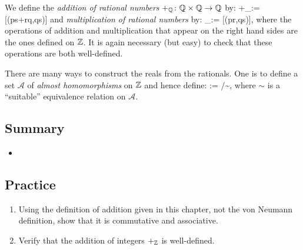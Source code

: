 \bd
We define the \emph{addition of rational numbers} $+_{\mathbb{Q}}\colon\mathbb{Q}\times\mathbb{Q}\to\mathbb{Q}$ by:
\bse
[(p,q)] +_\Q [(r,s)] := [(ps+rq,qs)]
\ese
and \emph{multiplication of rational numbers} by:
\bse
[(p,q)] \cdot_\Q [(r,s)] := [(pr,qs)],
\ese
where the operations of addition and multiplication that appear on the right hand sides are the ones defined on $\mathbb{Z}$. It is again necessary (but easy) to check that these operations are both well-defined.
\ed

There are many ways to construct the reals from the rationals. One is to define a set $\mathscr{A}$ of \emph{almost homomorphisms} on $\mathbb{Z}$ and hence define:
\bse
\R\index{$\R$} := /\!\sim,
\ese
where $\sim$ is a ``suitable'' equivalence relation on $\mathscr{A}$.

\subsection{Summary}

\begin{itemize}
\item 
\end{itemize}

\subsection*{Practice}

\begin{enumerate}
\item Using the definition of addition given in this chapter, not the von
Neumann definition, show that it is commutative and associative.
\item Verify that the addition of integers $+_{\mathbb{Z}}$ is well-defined.
\end{enumerate}
